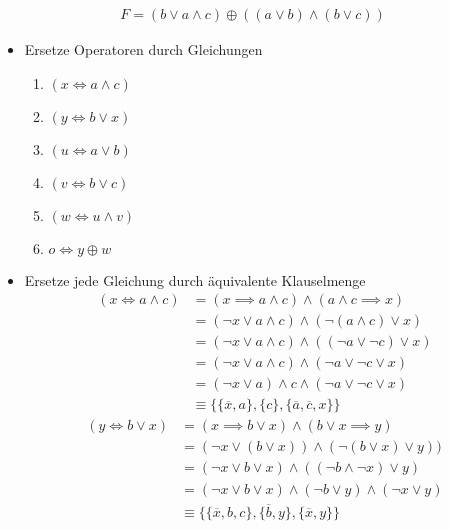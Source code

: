\documentclass{scrartcl}
\newcommand*\xor{\mathbin{\oplus}}
\begin{document}
\begin{align*}
	F = (b \vee a \wedge c) \xor ((a \vee b) \wedge (b \vee c))
\end{align*}

\begin{itemize}
	\item Ersetze Operatoren durch Gleichungen
	\begin{enumerate}
		\item $ (x \iff a \wedge c) $
		\item $ (y \iff b \vee x) $
		\item $ (u \iff a \vee b) $
		\item $ (v \iff b \vee c) $
		\item $ (w \iff u \wedge v) $
		\item $ o \iff y \xor w $
	\end{enumerate}
	\item Ersetze jede Gleichung durch äquivalente Klauselmenge
	\begin{equation}
		\begin{split}
			(x \iff a \wedge c) &= (x \implies a \wedge c) \wedge (a \wedge c \implies x) \\
			&= (\neg x \vee a \wedge c) \wedge (\neg (a \wedge c) \vee x) \\
			&= (\neg x \vee a \wedge c) \wedge ((\neg a \vee \neg c) \vee x) \\
			&= (\neg x \vee a \wedge c) \wedge (\neg a \vee \neg c \vee x) \\
			&= (\neg x \vee a) \wedge c \wedge (\neg a \vee \neg c \vee x) \\
			&\equiv \{ \{ \overline{x},a \},\{ c \},\{ \overline{a},\overline{c},x \} \}
		\end{split}
	\end{equation}
	\begin{equation}
		\begin{split}
			(y \iff b \vee x) &= (x \implies b \vee x) \wedge (b \vee x \implies y) \\
			&= (\neg x \vee (b \vee x)) \wedge (\neg (b \vee x) \vee y)) \\
			&= (\neg x \vee b \vee x) \wedge ((\neg b \wedge \neg x) \vee y) \\
			&= (\neg x  \vee b \vee x) \wedge (\neg b \vee y) \wedge (\neg x \vee y) \\
			&\equiv \{ \{ \overline{x},b,c \},\{ \overline{b},y \},\{ \overline{x},y \} \}
		\end{split}
	\end{equation}

\end{itemize}
\end{document}
